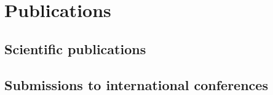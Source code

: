 
\chapter*{Publications}



\section*{Scientific publications}

\section*{Submissions to international conferences}

